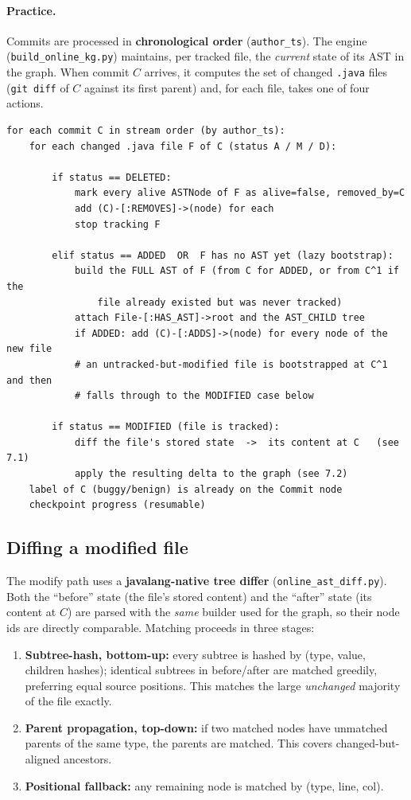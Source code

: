 \documentclass[11pt,a4paper]{article}
\newcommand{\code}[1]{\texttt{#1}}
\begin{document}
\paragraph{Practice.} Commits are processed in \textbf{chronological order}
(\code{author\_ts}). The engine (\texttt{build\_online\_kg.py}) maintains, per
tracked file, the \emph{current} state of its AST in the graph. When commit $C$
arrives, it computes the set of changed \texttt{.java} files (\code{git diff} of
$C$ against its first parent) and, for each file, takes one of four actions.

\begin{lstlisting}[style=algo,caption={Per-commit processing.}]
for each commit C in stream order (by author_ts):
    for each changed .java file F of C (status A / M / D):

        if status == DELETED:
            mark every alive ASTNode of F as alive=false, removed_by=C
            add (C)-[:REMOVES]->(node) for each
            stop tracking F

        elif status == ADDED  OR  F has no AST yet (lazy bootstrap):
            build the FULL AST of F (from C for ADDED, or from C^1 if the
                file already existed but was never tracked)
            attach File-[:HAS_AST]->root and the AST_CHILD tree
            if ADDED: add (C)-[:ADDS]->(node) for every node of the new file
            # an untracked-but-modified file is bootstrapped at C^1 and then
            # falls through to the MODIFIED case below

        if status == MODIFIED (file is tracked):
            diff the file's stored state  ->  its content at C   (see 7.1)
            apply the resulting delta to the graph (see 7.2)
    label of C (buggy/benign) is already on the Commit node
    checkpoint progress (resumable)
\end{lstlisting}

\subsection{Diffing a modified file}
The modify path uses a \textbf{javalang-native tree differ}
(\texttt{online\_ast\_diff.py}). Both the ``before'' state (the file's stored
content) and the ``after'' state (its content at $C$) are parsed with the
\emph{same} builder used for the graph, so their node ids are directly
comparable. Matching proceeds in three stages:

\begin{enumerate}[nosep]
  \item \textbf{Subtree-hash, bottom-up:} every subtree is hashed by
        (type, value, children hashes); identical subtrees in before/after are
        matched greedily, preferring equal source positions. This matches the
        large \emph{unchanged} majority of the file exactly.
  \item \textbf{Parent propagation, top-down:} if two matched nodes have
        unmatched parents of the same type, the parents are matched. This covers
        changed-but-aligned ancestors.
  \item \textbf{Positional fallback:} any remaining node is matched by
        (type, line, col).
\end{enumerate}
\end{document}
